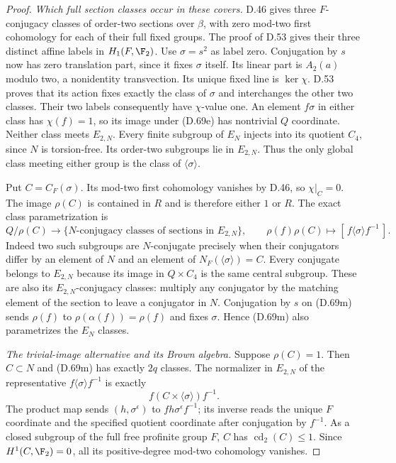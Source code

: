 \begin{proof}
\emph{Which full section classes occur in these covers.}
D.46 gives three $F$-conjugacy classes of order-two
sections over $\beta$, with zero mod-two first
cohomology for each of their full fixed groups.
The proof of D.53 gives their three distinct affine
labels in $H_1(F,\F_2)$. Use $\sigma=s^2$ as label zero.
Conjugation by $s$ now has zero translation part,
since it fixes $\sigma$ itself. Its linear part is
$A_2(a)$ modulo two, a nonidentity transvection.
Its unique fixed line is $\ker\chi$.
D.53 proves that its action fixes exactly the class
of $\sigma$ and interchanges the other two classes.
Their two labels consequently have $\chi$-value one.
An element $f\sigma$ in either class has
$\chi(f)=1$, so its image under (D.69e) has nontrivial
$Q$ coordinate. Neither class meets $E_{2,N}$.
Every finite subgroup of $E_N$ injects into its
quotient $C_4$, since $N$ is torsion-free.
Its order-two subgroups lie in $E_{2,N}$.
Thus the only global class meeting either group is
the class of $\langle\sigma\rangle$.

Put $C=C_F(\sigma)$. Its mod-two first cohomology
vanishes by D.46, so $\chi|_C=0$.
The image $\rho(C)$ is contained in $R$ and is
therefore either $1$ or $R$.
The exact class parametrization is
\[
 Q/\rho(C)\longrightarrow
 \{\text{$N$-conjugacy classes of sections in $E_{2,N}$}\},
 \qquad
 \rho(f)\rho(C)\longmapsto
          [\,f\langle\sigma\rangle f^{-1}\,].
                                                               \tag{D.69m}
\]
Indeed two such subgroups are $N$-conjugate precisely
when their conjugators differ by an element of $N$
and an element of $N_F(\langle\sigma\rangle)=C$.
Every conjugate belongs to $E_{2,N}$ because its
image in $Q\times C_4$ is the same central subgroup.
These are also its $E_{2,N}$-conjugacy classes:
multiply any conjugator by the matching element of
the section to leave a conjugator in $N$.
Conjugation by $s$ on (D.69m) sends $\rho(f)$ to
$\rho(\alpha(f))=\rho(f)$ and fixes $\sigma$.
Hence (D.69m) also parametrizes the $E_N$ classes.

\emph{The trivial-image alternative and its Brown algebra.}
Suppose $\rho(C)=1$.
Then $C\subset N$ and (D.69m) has exactly $2q$ classes.
The normalizer in $E_{2,N}$ of the representative
$f\langle\sigma\rangle f^{-1}$ is exactly
\[
                       f(C\times\langle\sigma\rangle)f^{-1}.
                                                               \tag{D.69n}
\]
The product map sends $(h,\sigma^\epsilon)$ to
$fh\sigma^\epsilon f^{-1}$; its inverse reads the
unique $F$ coordinate and the specified quotient
coordinate after conjugation by $f^{-1}$.
As a closed subgroup of the full free profinite
group $F$, $C$ has $\operatorname{cd}_2(C)\leq1$.
Since $H^1(C,\F_2)=0$, all its positive-degree
mod-two cohomology vanishes.


\end{proof}
